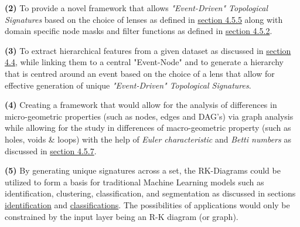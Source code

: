   \textbf{(2)} To provide a novel framework that allows \textit{"Event-Driven" Topological Signatures} based on the choice of  lenses  as defined in \hyperref[sec:sectionlens]{section 4.5.5} along with domain specific node masks and filter functions as defined in  \hyperref[sec:Filters]{section 4.5.2}.
  
  \textbf{(3)} To extract hierarchical features from a given dataset as discussed in \hyperref[sec:HEF]{section 4.4}, while linking them to a central "Event-Node" and to generate a hierarchy that is centred around an event based on the choice of a lens that allow for effective generation of unique \textit{"Event-Driven" Topological Signatures}.
  
  \textbf{(4)} Creating a framework that would allow for the analysis of differences in micro-geometric properties (such as nodes, edges and DAG's) via graph analysis while allowing for the study in differences of macro-geometric property (such as holes, voids \& loops) with the help of \textit{Euler characteristic} and \textit{Betti numbers} as discussed in \hyperref[sec:BettiNumber]{section 4.5.7}.
  
  \textbf{(5)} By generating unique signatures across a set, the RK-Diagrams could be utilized to form a basis for traditional Machine Learning models such as identification, clustering, classification, and segmentation as discussed in sections \hyperref[sec:TopoIdentifictaion]{identification} and \hyperref[sec:Classify]{classifications}. The possibilities of applications would only be constrained by the input layer being an R-K diagram (or graph).
